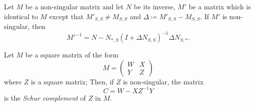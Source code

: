 \begin{corollary}
    \label{cor:1}
    Let \(M\) be a non-singular matrix and let \(N\) be its inverse, 
    \(M'\) be a matrix which is identical to \(M\) except that \(M'_{S, S} \neq M_{S, S}\)
    and \(\Delta \coloneqq M'_{S, S} - M_{S, S}\).
    If \(M'\) is non-singular, then
    \[
        M'^{-1} = N - N_{*, S}(I + \Delta N_{S, S})^{-1}\Delta N_{S, *}.
    \]
\end{corollary}

\begin{definition}
    Let \(M\) be a square matrix of the form
    \[
        M = 
        \begin{pmatrix}
            W & X \\
            Y & Z 
        \end{pmatrix}
    \]
    where \(Z\) is a square matrix; Then, if \(Z\) is non-singular, the matrix
    \[
        C = W - X Z^{-1} Y
    \]
    is the \textit{Schur complement} of \(Z\) in \(M\).
\end{definition}